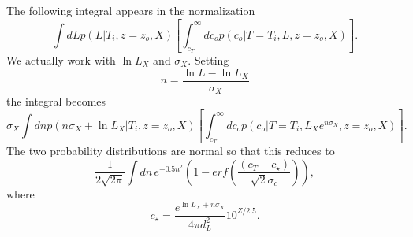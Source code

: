 \documentclass[preprint,3p]{elsarticle}
\begin{document}
The following integral appears in the normalization
\begin{equation}
\int dL p(L|T_i, z=z_o, X)  \left[\int_{c_T}^{\infty} dc_o  p(c_o | T=T_i, L, z=z_o, X)\right].
\end{equation}
We actually work with $\ln{L_X}$ and $\sigma_X$.  Setting
\begin{equation}
n=\frac{\ln{L}-\ln{L_X}}{\sigma_X}
\end{equation}
the integral becomes
 \begin{equation}
\sigma_X \int dn p(n\sigma_X + \ln{L_X} |T_i, z=z_o, X)  \left[\int_{c_T}^{\infty} dc_o  p(c_o | T=T_i, L_Xe^{n\sigma_X}, z=z_o, X)\right].
\end{equation}
The two probability distributions are normal so that this reduces to
 \begin{equation}
\frac{1}{2\sqrt{2\pi}} \int dn\, e^{-0.5n^2} \left(1-erf\left(\frac{(c_T - c_\star)}{\sqrt{2}\sigma_c}\right)\right),
\end{equation}
where
\begin{equation}
c_\star = \frac{e^{\ln{L_X}+n\sigma_X}}{4\pi d_L^2}10^{Z/2.5}.
\end{equation}
\end{document}
